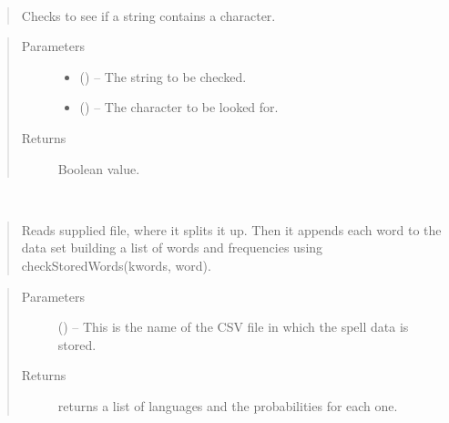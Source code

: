 \documentclass[letterpaper,10pt,english]{sphinxmanual}
\begin{document}
\begin{fulllineitems}
\label{code:hp_spells.contains}~\begin{quote}

Checks to see if a string contains a character.
\end{quote}
\begin{quote}\begin{description}
\item[{Parameters}] \leavevmode\begin{itemize}
\item {} 
 () -- The string to be checked.

\item {} 
 () -- The character to be looked for.

\end{itemize}

\item[{Returns}] \leavevmode
Boolean value.

\end{description}\end{quote}

\end{fulllineitems}


\begin{fulllineitems}
\label{code:hp_spells.count_instances}~\begin{quote}

Reads supplied file, where it splits it up. Then it appends each word to the data set building a list of words and frequencies using checkStoredWords(kwords, word).
\end{quote}
\begin{quote}\begin{description}
\item[{Parameters}] \leavevmode
{} () -- This is the name of the CSV file in which the spell data is stored.

\item[{Returns}] \leavevmode
returns a list of languages and the probabilities for each one.

\end{description}\end{quote}

\end{fulllineitems}
\end{document}
